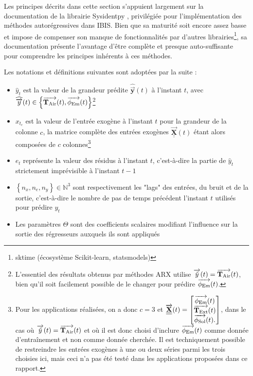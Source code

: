     Les principes décrits dans cette section s'appuient largement sur la documentation de la librairie Sysidentpy \cite{sysidentpy}, privilégiée pour l'implémentation des méthodes autorégressives dans IBIS\@.
    Bien que sa maturité soit encore assez basse et impose de compenser son manque de fonctionnalités par d'autres librairies\footnote{sktime (écosystème Scikit-learn, statsmodels)}, sa documentation présente l'avantage d'être
    complète et presque auto-suffisante pour comprendre les principes inhérents à ces méthodes.

    Les notations et définitions suivantes sont adoptées par la suite :
    \begin{itemize}
        \item $\hat y_t$ est la valeur de la grandeur prédite $\widehat{\overrightarrow {\mathbf y}}(t)$ à l'instant $t$, avec $\widehat{\overrightarrow y}(t) \in \left\{\operatorname{\overrightarrow{\mathbf{T}_{\text{Air}}}}(t),\operatorname{\overrightarrow{\mathbf{\phi}_{\text{Em}}}}(t)\right\}$\footnote{L'essentiel des résultats obtenus par méthodes ARX utilise $\overrightarrow{\hat y}(t) = \operatorname{\overrightarrow{\mathbf{T}_{\text{Air}}}}(t)$, bien qu'il soit facilement possible de le changer pour prédire $\operatorname{\overrightarrow{\mathbf{\phi}_{\text{Em}}}}(t)$.}
        \item $x_{t_{c}}$ est la valeur de l'entrée exogène à l'instant $t$ pour la grandeur de la colonne $c$, la matrice complète des entrées exogènes $\overrightarrow{\underline{\underline{\mathbf X}}}(t)$ étant alors composées de $c$ colonnes\footnote{
            Pour les applications réalisées, on a donc $c = 3$ et $\overrightarrow{\underline{\underline{\mathbf X}}}(t) = \begin{bmatrix}
            \operatorname{\overrightarrow{\mathbf{\phi}_{\text{Em}}}}(t) \\ \operatorname{\overrightarrow{\mathbf{T}_{\text{Ext}}}}(t) \\ \operatorname{\overrightarrow{\phi_{\text{Sol}}}}(t).
            \end{bmatrix}$, dans le cas où $\overrightarrow{\hat y}(t) = \operatorname{\overrightarrow{\mathbf{T}_{\text{Air}}}}(t)$ et où il est donc choisi d'inclure $\operatorname{\overrightarrow{\mathbf{\phi}_{\text{Em}}}}(t)$ comme donnée d'entraînement et non comme donnée cherchée.
            Il est techniquement possible de restreindre les entrées exogènes à une ou deux séries parmi les trois choisies ici, mais ceci n'a pas été testé dans les applications proposées dans ce rapport.}
        \item $e_t$ représente la valeur des résidus à l'instant $t$, c'est-à-dire la partie de $\hat y_t$ strictement imprévisible à l'instant $t-1$
        \item $\left\{n_x, n_e, n_y\right\} \in \mathbb N^3$ sont respectivement les "lags" des entrées, du bruit et de la sortie, c'est-à-dire le nombre de pas de temps précédent l'instant $t$ utilisés pour prédire $y_t$
        \item Les paramètres $\Theta$ sont des coefficients scalaires modifiant l'influence sur la sortie des régresseurs auxquels ils sont appliqués
    \end{itemize}

